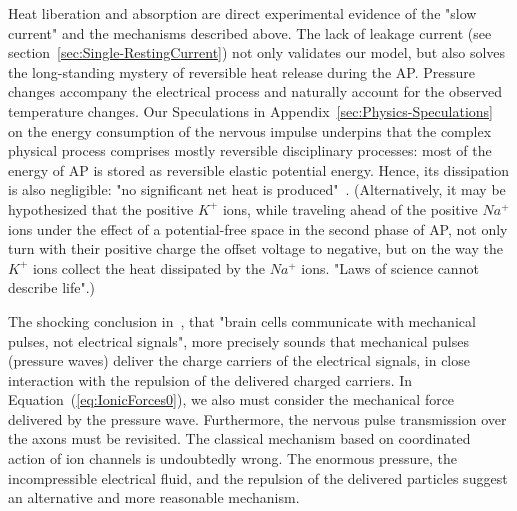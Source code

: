 Heat liberation and absorption are direct experimental evidence of the "slow current" and the mechanisms described above.
The lack of leakage current (see section~\ref{sec:Single-RestingCurrent})
not only validates our model, but also solves the long-standing mystery of reversible heat release during the \gls{AP}.
Pressure changes accompany the electrical process and naturally account for the observed temperature changes.
Our Speculations in Appendix~\ref{sec:Physics-Speculations} on the energy consumption of the nervous impulse underpins that the complex physical process comprises mostly reversible disciplinary processes:
most of the energy of \gls{AP} is stored as reversible elastic potential energy. Hence, its dissipation is also negligible: "no signiﬁcant net heat is produced"~\cite{ThermalBiophysics:2007}. (Alternatively, it may be hypothesized that the positive $K^+$ ions, while traveling ahead of the positive $Na^+$ ions under the effect of a potential-free space in the second phase of \gls{AP}, not only turn
with their positive charge the offset voltage to negative, but on the way the $K^+$ ions collect the heat dissipated by the  $Na^+$ ions. "Laws of science cannot describe life".)

The shocking conclusion in~\cite{MechanicalBrainPulses:2018}, that "brain cells communicate
with mechanical pulses, not electrical signals", more precisely sounds that mechanical pulses (pressure waves) deliver the charge carriers
of the electrical signals, in close interaction with the repulsion of the delivered charged carriers. In Equation~(\ref{eq:IonicForces0}),
we also must consider the mechanical force delivered by the pressure wave.
Furthermore, the nervous pulse transmission over the axons
must be revisited. The classical mechanism based on coordinated action
of ion channels is undoubtedly wrong. The enormous pressure, the incompressible electrical fluid,
and the repulsion of the delivered particles suggest
an alternative and more reasonable mechanism.



